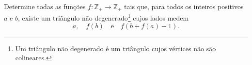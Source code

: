 Determine todas as funções $f: \mathbb{Z}_+ \to \mathbb{Z}_+$ tais que, para todos os inteiros positivos $a$ e $b$, existe um triângulo não degenerado\footnote{Um triângulo não degenerado é um triângulo cujos vértices não são colineares.} cujos lados medem
$$a, \quad f(b) \quad \mathrm{e} \quad f(b+f(a)-1).$$
